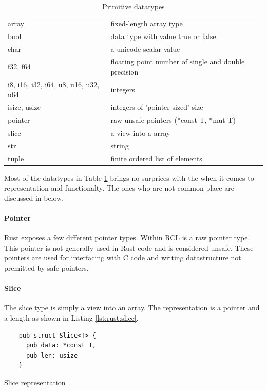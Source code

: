 \begin{table}[H]
  \begin{tabular}{l|l}
    array & fixed-length array type \\
    bool & data type with value true or false \\
    char & a unicode scalar value \\
    f32, f64 & floating point number of single and double precision \\
    i8, i16, i32, i64, u8, u16, u32, u64 & integers \\
    isize, usize & integers of 'pointer-sized' size \\
    pointer & raw unsafe pointers (*const T, *mut T) \\
    slice & a view into a array \\
    str & string \\
    tuple & finite ordered list of elements
  \end{tabular}

  \caption{Primitive datatypes}
  \label{tab:rust:datatypes}
\end{table}

Most of the datatypes in Table \ref{tab:rust:datatypes} brings no surprices with the when it comes to representation and functionalty.
The ones who are not common place are discussed in below.

\paragraph{Pointer}

Rust exposes a few different pointer types.
Within RCL is a raw pointer type.
This pointer is not generally used in Rust code and is considered unsafe.
These pointers are used for interfacing with C code and writing datastructure not premitted by safe pointers. 

\paragraph{Slice}

The slice type is simply a view into an array.
The representation is a pointer and a length as shown in Listing \ref{lst:rust:slice}.

\begin{listing}[H]
  \begin{verbatim}
    pub struct Slice<T> {
      pub data: *const T,
      pub len: usize
    }
\end{verbatim}
\caption{Slice representation}
\label{lst:rust:slice}
\end{listing}

